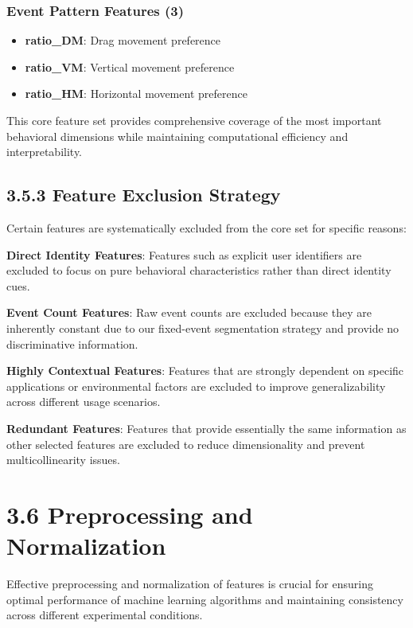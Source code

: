 \documentclass[
  12pt,
  a4paper,
]{report}
\providecommand{\tightlist}{%
  \setlength{\itemsep}{0pt}\setlength{\parskip}{0pt}}
\begin{document}
\subsubsection{Event Pattern Features
(3)}\label{event-pattern-features-3}

\begin{itemize}
\tightlist
\item
  \textbf{ratio\_DM}: Drag movement preference
\item
  \textbf{ratio\_VM}: Vertical movement preference
\item
  \textbf{ratio\_HM}: Horizontal movement preference
\end{itemize}

This core feature set provides comprehensive coverage of the most
important behavioral dimensions while maintaining computational
efficiency and interpretability.

\subsection{3.5.3 Feature Exclusion
Strategy}\label{feature-exclusion-strategy}

Certain features are systematically excluded from the core set for
specific reasons:

\textbf{Direct Identity Features}: Features such as explicit user
identifiers are excluded to focus on pure behavioral characteristics
rather than direct identity cues.

\textbf{Event Count Features}: Raw event counts are excluded because
they are inherently constant due to our fixed-event segmentation
strategy and provide no discriminative information.

\textbf{Highly Contextual Features}: Features that are strongly
dependent on specific applications or environmental factors are excluded
to improve generalizability across different usage scenarios.

\textbf{Redundant Features}: Features that provide essentially the same
information as other selected features are excluded to reduce
dimensionality and prevent multicollinearity issues.

\section{3.6 Preprocessing and
Normalization}\label{preprocessing-and-normalization}

Effective preprocessing and normalization of features is crucial for
ensuring optimal performance of machine learning algorithms and
maintaining consistency across different experimental conditions.
\end{document}
